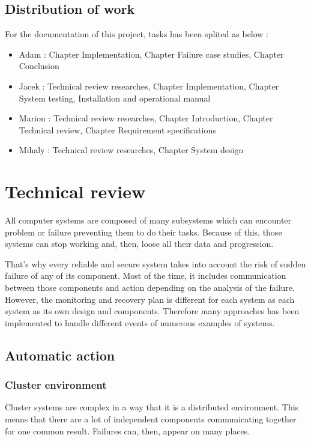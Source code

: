 \documentclass[10pt,a4paper]{report}
\begin{document}
	\section{Distribution of work}
For the documentation of this project, tasks has been splited as below :
\begin{itemize}
  \item Adam : Chapter Implementation, Chapter Failure case studies, Chapter Conclusion  
  \item Jacek : Technical review researches, Chapter Implementation, Chapter System testing, Installation and operational manual
  \item Marion : Technical review researches, Chapter Introduction, Chapter Technical review, Chapter Requirement specifications
  \item Mihaly : Technical review researches, Chapter System design
\end{itemize}

\chapter{Technical review}
All computer systems are composed of many subsystems which can encounter problem or failure preventing them to do their tasks. Because of this, those systems can stop working and, then, loose all their data and progression.

That's why every reliable and secure system takes into account the risk of sudden failure of any of its component. Most of the time, it includes communication between those components and action depending on the analysis of the failure. However, the monitoring and recovery plan is different for each system as each system as its own design and components. Therefore many approaches has been implemented to handle different events of numerous examples of systems. 

	\section{Automatic action}
		\subsection{Cluster environment}
Cluster systems are complex in a way that it is a distributed environment. This means that there are a lot of independent components communicating together for one common result. Failures can, then, appear on many places. 
\end{document}
